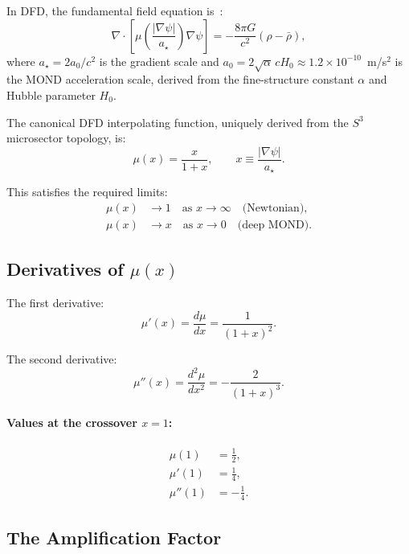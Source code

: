 \documentclass[aps,prd,twocolumn,superscriptaddress,nofootinbib]{revtex4-2}
\newcommand{\astar}{a_\star}
\newcommand{\ee}[1]{\times 10^{#1}}
\begin{document}
In DFD, the fundamental field equation is~\cite{Alcock2025DFD}:
\begin{equation}\label{eq:field-eq}
\nabla\cdot\left[\mu\!\left(\frac{|\nabla\psi|}{\astar}\right)
\nabla\psi\right] = -\frac{8\pi G}{c^2}(\rho - \bar\rho),
\end{equation}
where $\astar = 2a_0/c^2$ is the gradient scale and
$a_0 = 2\sqrt{\alpha}\,cH_0 \approx 1.2\ee{-10}$~m/s$^2$
is the MOND acceleration scale, derived from the fine-structure
constant $\alpha$ and Hubble parameter $H_0$.

The canonical DFD interpolating function, uniquely derived from the
$S^3$ microsector topology, is:
\begin{equation}\label{eq:mu-canonical}
\boxed{\mu(x) = \frac{x}{1+x}}, \qquad x \equiv \frac{|\nabla\psi|}{\astar}.
\end{equation}

This satisfies the required limits:
\begin{align}
\mu(x) &\to 1 \quad\text{as } x \to \infty \quad\text{(Newtonian)},\\
\mu(x) &\to x \quad\text{as } x \to 0 \quad\text{(deep MOND)}.
\end{align}

\subsection{Derivatives of $\mu(x)$}

The first derivative:
\begin{equation}
\mu'(x) = \frac{d\mu}{dx} = \frac{1}{(1+x)^2}.
\end{equation}

The second derivative:
\begin{equation}
\mu''(x) = \frac{d^2\mu}{dx^2} = -\frac{2}{(1+x)^3}.
\end{equation}

\paragraph{Values at the crossover $x = 1$:}
\begin{align}
\mu(1) &= \frac{1}{2}, \\
\mu'(1) &= \frac{1}{4}, \\
\mu''(1) &= -\frac{1}{4}.
\end{align}

\subsection{The Amplification Factor}
\end{document}
